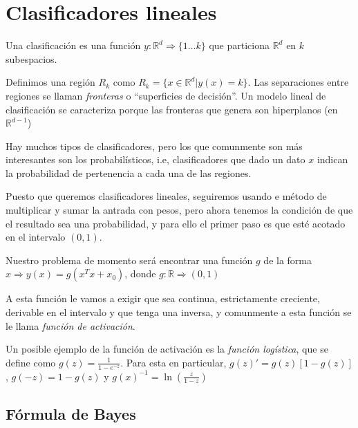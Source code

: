 \section{Clasificadores lineales}
Una clasificación es una función $y: \mathbb{R}^d \Rightarrow \{1 \dots k\}$
que particiona $\mathbb{R}^d$ en $k$ subespacios.

Definimos una región $R_k$ como $R_k = \{x \in \mathbb{R}^d | y(x) = k \}$. Las
separaciones entre regiones se llaman \textit{fronteras} o ``superficies
de decisión''. Un modelo lineal de clasificación se caracteriza porque las
fronteras que genera son hiperplanos (en $\mathbb{R}^{d - 1}$)

Hay muchos tipos de clasificadores, pero los que comunmente son más
interesantes son los probabilísticos, i.e, clasificadores que dado un
dato $x$ indican la probabilidad de pertenencia a cada una de las regiones.

Puesto que queremos clasificadores lineales, seguiremos usando e método de
multiplicar y sumar la antrada con pesos, pero ahora tenemos la condición de
que el resultado sea una probabilidad, y para ello el primer paso es que esté
acotado en el intervalo $(0,1)$.

Nuestro problema de momento será encontrar una función $g$ de la forma
$x \Rightarrow y(x) = g(x^Tx + x_0)$, donde $g: \mathbb{R} \Rightarrow (0,1)$

A esta función le vamos a exigir que sea continua, estrictamente creciente,
derivable en el intervalo y que tenga una inversa, y comunmente a esta función
se le llama \textit{función de activación}.

Un posible ejemplo de la función de activación es la \textit{función logística},
que se define como $g(z) = \frac{1}{1 - e^{-z}}$. Para esta en particular, $g(z)' = g(z) [1 - g(z)]$, $g(-z) =   1 - g(z)$ y $g(x)^{-1} = \ln(\frac{z}{1 - z})$

\subsection{Fórmula de Bayes}

